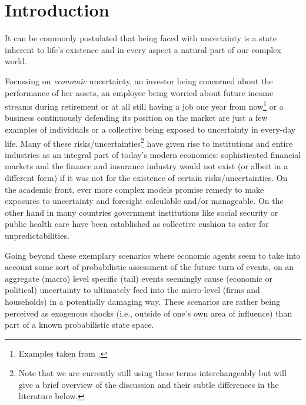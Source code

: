 \documentclass[a4paper,11pt,listof=nochaptergap,oneside,pointednumbers,bibtotoc,bigheadings,liststotoc,hidelinks]{scrbook}
\theoremstyle{mysatz}
\theoremstyle{mydefinition}
\theoremstyle{mytheorem}
\theoremstyle{mybemerkung}
\begin{document}
\chapter{Introduction}
\label{introduction}
It can be commonly postulated that being faced with uncertainty is a state inherent to life's existence and in every aspect a natural part of our complex world.

Focussing on \textit{economic} uncertainty, an investor being concerned about the performance of her assets, an employee being worried about future income streams during retirement or at all still having a job one year from now\footnote{Examples taken from \citet{stockhammerramskogler:07}.} or a business continuously defending its position on the market are just a few examples of individuals or a collective being exposed to uncertainty in every-day life. Many of these risks/uncertainties\footnote{Note that we are currently still using these terms interchangeably but will give a brief overview of the discussion and their subtle differences in the literature below.} have given rise to institutions and entire industries as an integral part of today's modern economies: sophisticated financial markets and the finance and insurance industry would not exist (or albeit in a different form) if it was not for the existence of certain risks/uncertainties. On the academic front, ever more complex models promise remedy to make exposures to uncertainty and foresight calculable and/or manageable. On the other hand in many countries government institutions like social security or public health care have been established as collective cushion to cater for unpredictabilities.

Going beyond these exemplary scenarios where economic agents seem to take into account some sort of probabilistic assessment of the future turn of events, on an aggregate (macro) level specific (tail) events seemingly cause (economic or political) uncertainty to ultimately feed into the micro-level (firms and households) in a potentially damaging way. These scenarios are rather being perceived as exogenous shocks (i.e., outside of one's own area of influence) than part of a known probabilistic state space.
\end{document}
